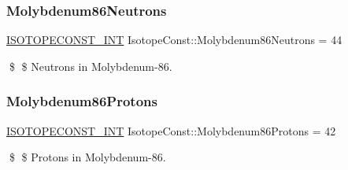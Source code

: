 \subsubsection{\texorpdfstring{Molybdenum86\+Neutrons}{Molybdenum86Neutrons}}
{\footnotesize\ttfamily \mbox{\hyperlink{group___isotope_const-_macros_ga5f18360b3e99483a35c32d789e62621c}{I\+S\+O\+T\+O\+P\+E\+C\+O\+N\+S\+T\+\_\+\+I\+NT}} Isotope\+Const\+::\+Molybdenum86\+Neutrons = 44}

\$ \$ Neutrons in Molybdenum-\/86. \mbox{\label{group___isotope_const-_molybdenum-_mo86_ga715951bbf17891cfce0303a7346679b9}} 
\subsubsection{\texorpdfstring{Molybdenum86\+Protons}{Molybdenum86Protons}}
{\footnotesize\ttfamily \mbox{\hyperlink{group___isotope_const-_macros_ga5f18360b3e99483a35c32d789e62621c}{I\+S\+O\+T\+O\+P\+E\+C\+O\+N\+S\+T\+\_\+\+I\+NT}} Isotope\+Const\+::\+Molybdenum86\+Protons = 42}

\$ \$ Protons in Molybdenum-\/86. 